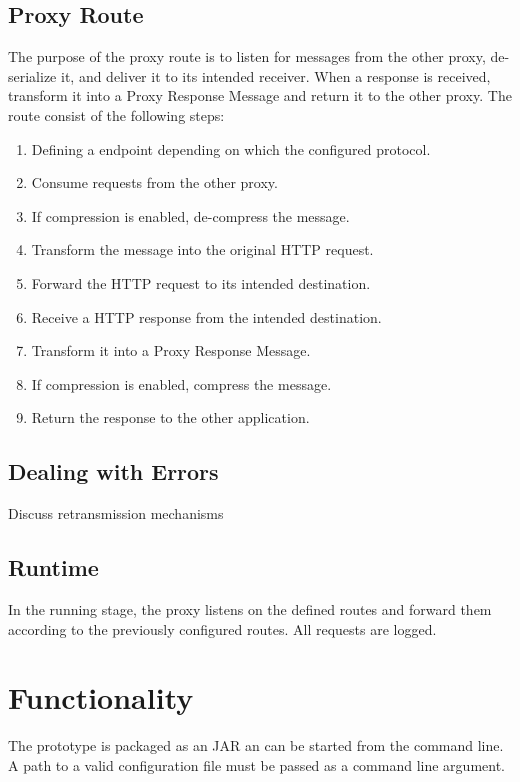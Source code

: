 \subsection{Proxy Route}

The purpose of the proxy route is to listen for messages from the other proxy,
de-serialize it, and deliver it to its intended receiver. When a response is
received, transform it into a Proxy Response Message and return it to the other
proxy. The route consist of the following steps:

\begin{enumerate}
	\item Defining a endpoint depending on which the configured protocol.
	\item Consume requests from the other proxy.
	\item If compression is enabled, de-compress the message.
	\item Transform the message into the original HTTP request.
	\item Forward the HTTP request to its intended destination.
	\item Receive a HTTP response from the intended destination.
	\item Transform it into a Proxy Response Message.
	\item If compression is enabled, compress the message.
	\item Return the response to the other application.
\end{enumerate}

\subsection{Dealing with Errors}

Discuss retransmission mechanisms

\subsection{Runtime}

In the running stage, the proxy listens on the defined routes and forward them
according to the previously configured routes. All requests are logged.


\section{Functionality}

The prototype is packaged as an JAR an can be started from the command line. A
path to a valid configuration file must be passed as a command line argument.



